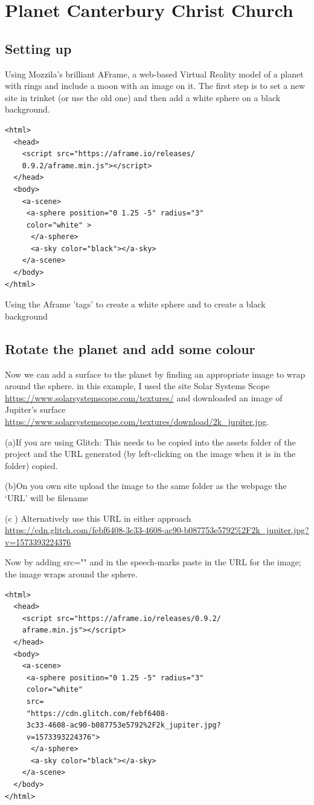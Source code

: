 \chapter{Planet Canterbury Christ Church}
\section{Setting up}
Using Mozzila's brilliant AFrame, a web-based Virtual Reality model of a planet with rings and include a moon with an image on it.
The first step is to set a new site in trinket (or use the old one)  and then add a white sphere on a black background.
\begin{lstlisting}
<html>
  <head>
    <script src="https://aframe.io/releases/
    0.9.2/aframe.min.js"></script>
  </head>
  <body>
    <a-scene>
     <a-sphere position="0 1.25 -5" radius="3" 
     color="white" >
      </a-sphere>   
      <a-sky color="black"></a-sky>
    </a-scene>
  </body>
</html>
\end{lstlisting}

Using the Aframe 'tags' to create a white sphere and to create a black background

\section{Rotate the planet and add some colour}
Now we can add a surface to the planet by finding an appropriate image to wrap around the sphere. in this example, I used the site Solar Systems Scope \url{https://www.solarsystemscope.com/textures/} and downloaded an image of Jupiter's surface \url{https://www.solarsystemscope.com/textures/download/2k_jupiter.jpg}.

 

(a)If you are using Glitch: This needs to be copied into the assets folder of the project and the URL generated (by left-clicking on the image when it is in the folder) copied.

(b)On you own site upload the image to the same folder as the webpage the ‘URL’ will be filename

(c ) Alternatively use this URL in either approach \url{https://cdn.glitch.com/febf6408-3c33-4608-ac90-b087753e5792%2F2k_jupiter.jpg?v=1573393224376}

Now by adding src="" and in the speech-marks paste in the URL for the image; the image wraps around the sphere.
\begin{lstlisting}
<html>
  <head>
    <script src="https://aframe.io/releases/0.9.2/
    aframe.min.js"></script>
  </head>
  <body>
    <a-scene>
     <a-sphere position="0 1.25 -5" radius="3" 
     color="white" 
     src=
     "https://cdn.glitch.com/febf6408-
     3c33-4608-ac90-b087753e5792%2F2k_jupiter.jpg?
     v=1573393224376">
      </a-sphere>   
      <a-sky color="black"></a-sky>
    </a-scene>
  </body>
</html>
\end{lstlisting}

